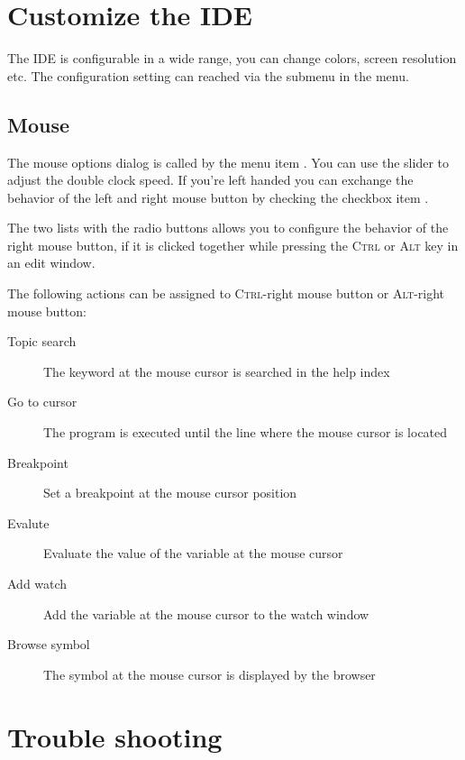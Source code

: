 \section{Customize the IDE}
The IDE is configurable in a wide range, you can change colors, screen
resolution etc. The configuration setting can reached via the
submenu  in the  menu.

\subsection{Mouse}
\label{ide:prefmouse}
The mouse options dialog is called by the menu item
. You can use the slider to adjust the
double clock speed. If you're left handed you can exchange the
behavior of the left and right mouse button by checking the checkbox
item .

The two lists with the radio buttons allows you
to configure the behavior of the
right mouse button, if it is clicked together while
pressing the \textsc{Ctrl} or
\textsc{Alt} key in an edit window.

The following actions can be assigned to \textsc{Ctrl}-right mouse button or
\textsc{Alt}-right mouse button:

\begin{description}
\item [Topic search] The keyword at the mouse cursor is searched in the
help index
\item [Go to cursor] The program is executed until the line where
the mouse cursor is located
\item [Breakpoint] Set a breakpoint at the mouse cursor position
\item [Evalute] Evaluate the value of the variable at the mouse
cursor
\item [Add watch] Add the variable at the mouse cursor to the
watch window
\item [Browse symbol] The symbol at the mouse cursor is displayed
by the browser
\end{description}


\section{Trouble shooting}

